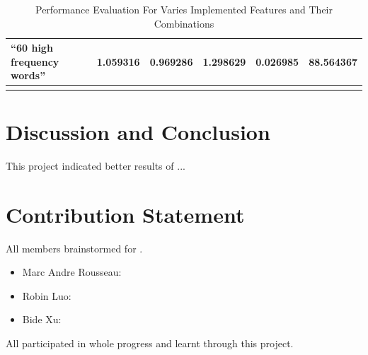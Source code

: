 \documentclass[letterpaper, 11pt]{article}
\renewcommand{\headrulewidth}{0pt}
\renewcommand{\footrulewidth}{0pt}
\begin{document}
\begin{table}[]
\begin{tabular}{|l|l|l|l|l|l|}
\textbf{“60 high frequency  words”}                                                                                                                                       & 1.059316                                                                    & 0.969286                                                                      & 1.298629                                                                   & 0.026985                                                            & 88.564367                                                                                                                                                     \\ \hline
                                                                                                                                                    \\ \hline
\end{tabular}
\caption{Performance Evaluation For Varies Implemented Features and Their Combinations}
\label{tbl:table_fp}
\end{table}


\section*{Discussion and Conclusion}

This project indicated better results of ...

\section*{Contribution Statement}

All members brainstormed for .
\begin{itemize}
	\item Marc Andre Rousseau:
	\item Robin Luo: 
    \item Bide Xu: 
\end{itemize}

All participated in whole progress and learnt through this project.


\nocite{*}





\begingroup


    


\endgroup
\renewcommand{\thepage}{}

%






\end{document}

